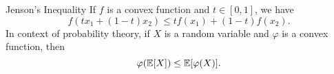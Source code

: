 \begin{theorem}[thm:]{Jenson's Inequality}
    If $f$ is a convex function and $t\in [0,1]$, we have
    \[f(tx_1+(1-t)x_2)\leq tf(x_1)+(1-t)f(x_2).\]
    In context of probability theory, if $X$ is a random variable and $\varphi $ is a convex function, then
    \[\varphi (\mathbb{E}[X])\leq \mathbb{E}[\varphi (X)].\]
\end{theorem}
